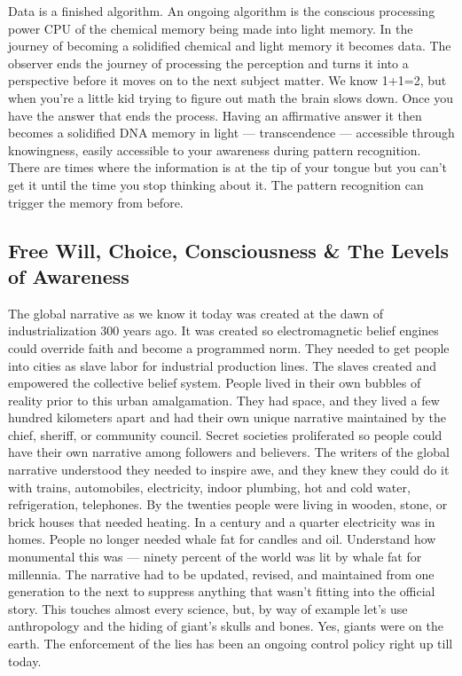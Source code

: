 Data is a finished algorithm. An ongoing algorithm is the conscious
processing power CPU of the chemical memory being made into light
memory. In the journey of becoming a solidified chemical and light
memory it becomes data. The observer ends the journey of processing the
perception and turns it into a perspective before it moves on to the
next subject matter. We know 1+1=2, but when you're a little kid trying
to figure out math the brain slows down. Once you have the answer that
ends the process. Having an affirmative answer it then becomes a
solidified DNA memory in light --- transcendence --- accessible through
knowingness, easily accessible to your awareness during pattern
recognition. There are times where the information is at the tip of your
tongue but you can't get it until the time you stop thinking about it.
The pattern recognition can trigger the memory from before.

\subsection*{Free Will, Choice, Consciousness \& The Levels of
Awareness}\label{free-will-choice-consciousness-the-levels-of-awareness}

The global narrative as we know it today was created at the dawn of
industrialization 300 years ago. It was created so electromagnetic
belief engines could override faith and become a programmed norm. They
needed to get people into cities as slave labor for industrial
production lines. The slaves created and empowered the collective belief
system. People lived in their own bubbles of reality prior to this urban
amalgamation. They had space, and they lived a few hundred kilometers
apart and had their own unique narrative maintained by the chief,
sheriff, or community council. Secret societies proliferated so people
could have their own narrative among followers and believers. The
writers of the global narrative understood they needed to inspire awe,
and they knew they could do it with trains, automobiles, electricity,
indoor plumbing, hot and cold water, refrigeration, telephones. By the
twenties people were living in wooden, stone, or brick houses that
needed heating. In a century and a quarter electricity was in homes.
People no longer needed whale fat for candles and oil. Understand how
monumental this was --- ninety percent of the world was lit by whale fat
for millennia. The narrative had to be updated, revised, and maintained
from one generation to the next to suppress anything that wasn't fitting
into the official story. This touches almost every science, but, by way
of example let's use anthropology and the hiding of giant's skulls and
bones. Yes, giants were on the earth. The enforcement of the lies has
been an ongoing control policy right up till today.

